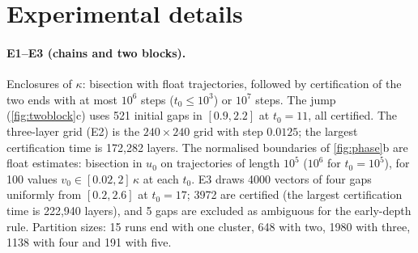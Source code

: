 \begin{table}[h]
\centering\small\setlength{\tabcolsep}{4pt}

\caption{Residual $(\kappa-1)L-[\log L-\frac12\log\log L+\frac12\log\lambda]$ of the two-term law (\cref{thm:two-block}(v), which proves
that it tends to $0$), and the residual after adding the third term $\frac{\log\log L-\log\lambda+2}{4\log L}$ (\cref{prop:third}, which proves that this
residual is $o(1/\log L)$). Computed
in the continuum limit $dx/d\tau=-\lambda(1+x)e^{-\tau(2x+x^2)}$, $\tau=\log s$, by shooting for the critical $x(L)$. The continuum values lie inside
the discrete enclosures of \cref{tab:kappa} for $100\le t_0\le10^6$.}
\label{tab:residual}
\end{table}

\begin{table}[h]
\centering\small

\caption{Initial conditions of the three-layer chain at $t_0=11$ whose limiting partition is proved with \texttt{mpmath} interval arithmetic
(\cref{thm:cap}(b)); $T$ is the layer at which all certificates hold. For comparison, $\kappa(11)\in(1.538,1.540]$.}
\label{tab:rigorous}
\end{table}

\section{Experimental details}\label{app:exp}

\paragraph{E1--E3 (chains and two blocks).} Enclosures of $\kappa$: bisection with float trajectories, followed by certification of the two
ends with at most $10^6$ steps ($t_0\le10^3$) or $10^7$ steps. The jump (\cref{fig:twoblock}c) uses 521 initial gaps in $[0.9,2.2]$ at $t_0=11$, all certified. The
three-layer grid (E2) is the $240\times240$ grid with step $0.0125$; the largest certification time is 172,282 layers. The normalised boundaries
of \cref{fig:phase}b are float estimates: bisection in $u_0$ on trajectories of length $10^5$ ($10^6$ for $t_0=10^5$),
for 100 values $v_0\in[0.02,2]\,\kappa$ at each $t_0$. E3 draws 4000 vectors of four gaps uniformly from
$[0.2,2.6]$ at $t_0=17$; 3972 are certified (the largest certification time is 222,940 layers), and 5 gaps are excluded as ambiguous for the
early-depth rule. Partition sizes: 15 runs end with one cluster, 648 with two, 1980 with three, 1138 with four and 191 with five.

